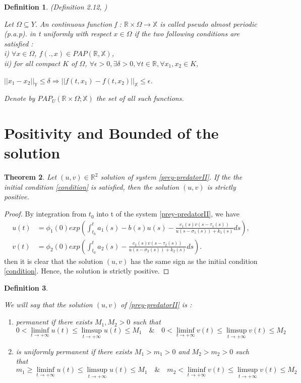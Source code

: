 \documentclass[[a4paper,10pt]{article}
\newcommand{\X}{\mathbb{X}}
\newcommand{\Y}{\mathbb{Y}}
\newcommand{\R}{\mathbb{R}}
\newtheorem{theorem}{Theorem}[section]
\newtheorem{definition}[theorem]{Definition}%
\begin{document}
\begin{definition} (Definition 2.12, \cite{chuanyi2003almost}) \item  Let $\Omega \subseteq Y$. An continuous function f : $\R \times\Omega \longrightarrow \X$  is called pseudo almost periodic (p.a.p).
in t uniformly with respect $x \in \Omega$ if the two following conditions are satisfied :\\
i) $\forall x \in  \Omega$, $f(., x) \in PAP(\R,\X)$,\\
ii) for all compact $K$ of $\Omega$, $\forall \epsilon> 0, \exists \delta > 0, \forall t \in \mathbb{R}, \forall x_1, x_2 \in K$,
\begin{center}
$||x_1 - x_2||_{\Y} \leq \delta \Rightarrow  ||f(t, x_1) - f(t, x_2)||_{\X} \leq \epsilon$.
\end{center}
Denote by $PAP_U(\R\times \Omega; \X)$  the set of all such functions.
\end{definition}
\section{Positivity and Bounded of the  solution}

\begin{theorem}\label{positive}
Let $(u,v) \in \R^2$ solution of system  \eqref{prey-predatorII}. If the the initial condition \eqref{condition} is satisfied, then the solution $(u,v)$ is strictly positive. 
\end{theorem}

\begin{proof}
By integration from $t_0$ into t of the system \eqref{prey-predatorII}, we have
\begin{align*}
\displaystyle u(t)&=\phi_1(0)exp\left( \int_{t_0}^t a_1(s)-b(s)u(s)-\frac{c_1(s)v(s-\tau_1(s))}{u(s-\sigma_1(s))+k_1(s)}ds\right) ,\\
\displaystyle v(t)&=\phi_2(0)exp\left(\int_{t_0}^t a_2(s)-\frac{c_2(s)v(s-\tau_2(s))}{u(s-\sigma_2(s))+k_2(s)}ds\right).
\end{align*}
then it is clear that the solution $(u,v)$ has the same sign as the initial condition \eqref{condition}. Hence, the solution is strictly positive. 
\end{proof}
\begin{definition}\cite{lu2015permanence}\item
We will say that  the solution $(u,v)$ of \eqref{prey-predatorII} is :\begin{enumerate}
\item permanent if there
exists $M_1,M_2 > 0$ such that 
$$0 < \liminf_{t\rightarrow +\infty}
u(t) \leq \limsup_{t\rightarrow +\infty}
u(t) \leq M_1\quad\& \quad 0 < \liminf_{t\rightarrow +\infty}
v(t) \leq \limsup_{t\rightarrow +\infty}
v(t) \leq M_2$$
\item is  uniformly permanent if there exists $M_1 > m_1> 0$ and $M_2 > m_2> 0$ such that
$$m_1 \geq \liminf_{t\rightarrow +\infty}
u(t) \leq \limsup_{t\rightarrow +\infty}
u(t) \leq M_1\quad\& \quad m_2 < \liminf_{t\rightarrow +\infty}
v(t) \leq \limsup_{t\rightarrow +\infty}
v(t) \leq M_2$$

\end{enumerate}
\end{definition}
\end{document}
